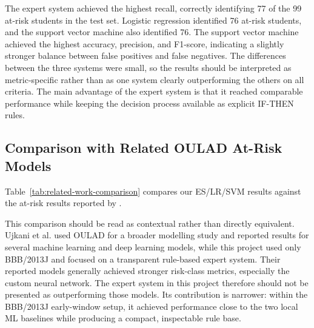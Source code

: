 

The expert system achieved the highest recall, correctly identifying 77 of the 99 at-risk students in the test set. Logistic regression identified 76 at-risk students, and the support vector machine also identified 76. The support vector machine achieved the highest accuracy, precision, and F1-score, indicating a slightly stronger balance between false positives and false negatives. The differences between the three systems were small, so the results should be interpreted as metric-specific rather than as one system clearly outperforming the others on all criteria. The main advantage of the expert system is that it reached comparable performance while keeping the decision process available as explicit IF-THEN rules.

\subsection{Comparison with Related OULAD At-Risk Models}

Table~\ref{tab:related-work-comparison} compares our ES/LR/SVM results against the at-risk results reported by \textcite{ujkani2024oulad}.



This comparison should be read as contextual rather than directly equivalent. Ujkani et al. used OULAD for a broader modelling study and reported results for several machine learning and deep learning models, while this project used only BBB/2013J and focused on a transparent rule-based expert system. Their reported models generally achieved stronger risk-class metrics, especially the custom neural network. The expert system in this project therefore should not be presented as outperforming those models. Its contribution is narrower: within the BBB/2013J early-window setup, it achieved performance close to the two local ML baselines while producing a compact, inspectable rule base.
